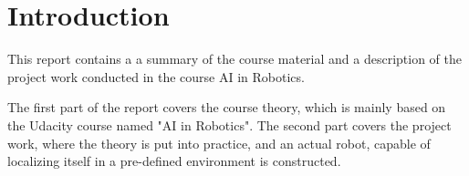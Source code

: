 \documentclass[Main]{subfiles}
\begin{document}
\chapter{Introduction} %
\label{cha:introduction}

This report contains a a summary of the course material and a description of the project work conducted in the course AI in Robotics.

The first part of the report covers the course theory, which is mainly based on the Udacity course named "AI in Robotics".
The second part covers the project work, where the theory is put into practice, and an actual robot, capable of localizing itself in a pre-defined environment is constructed.

\end{document}
